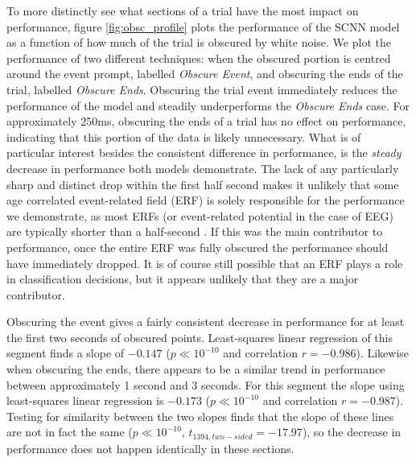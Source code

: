 \documentclass[fleqn,10pt]{wlscirep}
\begin{document}
To more distinctly see what sections of a trial have the most impact on performance, figure \ref{fig:obsc_profile} plots the performance of the SCNN model as a function of how much of the trial is obscured by white noise. We plot the performance of two different techniques: when the obscured portion is centred around the event prompt, labelled {\em Obscure Event}, and obscuring the ends of the trial, labelled {\em Obscure Ends}. Obscuring the trial event immediately reduces the performance of the model and steadily underperforms the {\em Obscure Ends} case. For approximately 250ms, obscuring the ends of a trial has no effect on performance, indicating that this portion of the data is likely unnecessary. What is of particular interest besides the consistent difference in performance, is the {\em steady} decrease in performance both models demonstrate. The lack of any particularly sharp and distinct drop within the first half second makes it unlikely that some age correlated event-related field (ERF) is solely responsible for the performance we demonstrate, as most ERFs (or event-related potential in the case of EEG) are typically shorter than a half-second \cite{ElectricFieldsOfTheBrain}. If this was the main contributor to performance, once the entire ERF was fully obscured the performance should have immediately dropped. It is of course still possible that an ERF plays a role in classification decisions, but it appears unlikely that they are a major contributor.

Obscuring the event gives a fairly consistent decrease in performance for at least the first two seconds of obscured points. Least-squares linear regression of this segment finds a slope of $-0.147$ ($p \ll 10^{-10}$ and correlation $r=-0.986$). Likewise when obscuring the ends, there appears to be a similar trend in performance between approximately 1 second and 3 seconds. For this segment the slope using least-squares linear regression is $-0.173$ ($p \ll 10^{-10}$ and correlation $r=-0.987$). Testing for similarity between the two slopes finds that the slope of these lines are not in fact the same ($p \ll 10^{-10}$, $t_{1394, two-sided}=-17.97$), so the decrease in performance does not happen identically in these sections.
\end{document}
